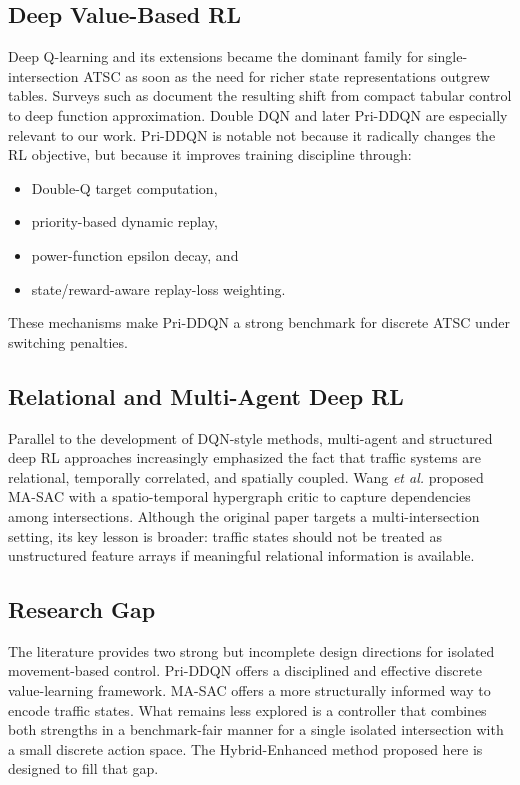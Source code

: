\documentclass[conference]{IEEEtran}
\begin{document}
\subsection{Deep Value-Based RL}
Deep Q-learning and its extensions became the dominant family for
single-intersection ATSC as soon as the need for richer state
representations outgrew tables. Surveys such as
\cite{Haydari2020DeepRLC} document the resulting shift from compact
tabular control to deep function approximation. Double DQN
\cite{Gu2020DoubleDQD} and later Pri-DDQN
\cite{Zheng2024PriDDQNLAG} are especially relevant to our work.
Pri-DDQN is notable not because it radically changes the RL
objective, but because it improves training discipline through:

\begin{itemize}
\item Double-Q target computation,
\item priority-based dynamic replay,
\item power-function epsilon decay, and
\item state/reward-aware replay-loss weighting.
\end{itemize}

These mechanisms make Pri-DDQN a strong benchmark for discrete ATSC
under switching penalties.

\subsection{Relational and Multi-Agent Deep RL}
Parallel to the development of DQN-style methods, multi-agent and
structured deep RL approaches increasingly emphasized the fact that
traffic systems are relational, temporally correlated, and spatially
coupled. Wang \emph{et al.} \cite{Wang2024TowardMRP} proposed MA-SAC
with a spatio-temporal hypergraph critic to capture dependencies
among intersections. Although the original paper targets a
multi-intersection setting, its key lesson is broader: traffic states
should not be treated as unstructured feature arrays if meaningful
relational information is available.

\subsection{Research Gap}
The literature provides two strong but incomplete design directions
for isolated movement-based control. Pri-DDQN offers a disciplined
and effective discrete value-learning framework. MA-SAC offers a more
structurally informed way to encode traffic states. What remains less
explored is a controller that combines both strengths in a
benchmark-fair manner for a single isolated intersection with a small
discrete action space. The Hybrid-Enhanced method proposed here is
designed to fill that gap.
\end{document}
